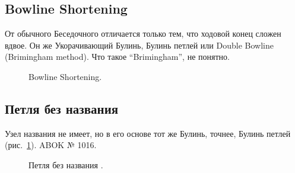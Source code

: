 \subsection{Bowline Shortening}

От обычного Беседочного отличается только тем, что ходовой конец сложен вдвое. Он же Укорачивающий Булинь, Булинь петлей или Double Bowline (Brimingham method). Что такое \enquote{Brimingham}, не понятно.

\begin{figure}[H]\centering
	\subfloat[Завязывание]{\label{ris:Bowline_Shortening_1}
	\tcbox[enhanced jigsaw,colframe=black,opacityframe=0.5,opacityback=0.5]
		{\centering
			}
		}
\end{figure}

\begin{figure}[H]\centering
	\subfloat[Завязывание]{\label{ris:Bowline_Shortening_2}
	\tcbox[enhanced jigsaw,colframe=black,opacityframe=0.5,opacityback=0.5]
		{\centering
			}
		}
\end{figure}

\begin{figure}[H]\centering
	\subfloat[Результат]{\label{ris:Bowline_Shortening_3}
	\tcbox[enhanced jigsaw,colframe=black,opacityframe=0.5,opacityback=0.5]
		{\centering
			}
		}
	\caption{Bowline Shortening.}\label{ris:Bowline_Shortening}
\end{figure}

\addtocounter{LoopNoName}{1}

\subsection{Петля без названия }

Узел названия не имеет, но в его основе тот же Булинь, точнее, Булинь петлей (рис.~\ref{ris:Bowline_Shortening}). ABOK № 1016.

\begin{figure}[H]\centering
	\subfloat[Завязывание]{\label{ris:LoopNoName_1}
	\tcbox[enhanced jigsaw,colframe=black,opacityframe=0.5,opacityback=0.5]
		{\centering
			}
		}
\end{figure}

\begin{figure}[H]\centering
	\subfloat[Результат]{\label{ris:LoopNoName_2}
	\tcbox[enhanced jigsaw,colframe=black,opacityframe=0.5,opacityback=0.5]
		{\centering
			}
		}
	\caption{Петля без названия .}\label{ris:LoopNoName}
\end{figure}

